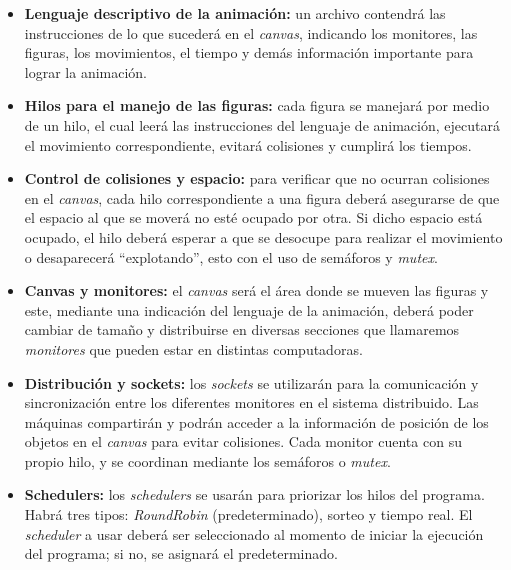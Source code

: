 \documentclass[12pt]{article}
\begin{document}
\begin{itemize}
    \item \textbf{Lenguaje descriptivo de la animación:} un archivo contendrá las instrucciones de lo que sucederá en el \textit{canvas}, indicando los monitores, las figuras, los movimientos, el tiempo y demás información importante para lograr la animación.
    
    \item \textbf{Hilos para el manejo de las figuras:} cada figura se manejará por medio de un hilo, el cual leerá las instrucciones del lenguaje de animación, ejecutará el movimiento correspondiente, evitará colisiones y cumplirá los tiempos.
    
    \item \textbf{Control de colisiones y espacio:} para verificar que no ocurran colisiones en el \textit{canvas}, cada hilo correspondiente a una figura deberá asegurarse de que el espacio al que se moverá no esté ocupado por otra. Si dicho espacio está ocupado, el hilo deberá esperar a que se desocupe para realizar el movimiento o desaparecerá ``explotando'', esto con el uso de semáforos y \textit{mutex}.
    
    \item \textbf{Canvas y monitores:} el \textit{canvas} será el área donde se mueven las figuras y este, mediante una indicación del lenguaje de la animación, deberá poder cambiar de tamaño y distribuirse en diversas secciones que llamaremos \textit{monitores} que pueden estar en distintas computadoras.
    
    \item \textbf{Distribución y sockets:} los \textit{sockets} se utilizarán para la comunicación y sincronización entre los diferentes monitores en el sistema distribuido. Las máquinas compartirán y podrán acceder a la información de posición de los objetos en el \textit{canvas} para evitar colisiones. Cada monitor cuenta con su propio hilo, y se coordinan mediante los semáforos o \textit{mutex}.
    
    \item \textbf{Schedulers:} los \textit{schedulers} se usarán para priorizar los hilos del programa. Habrá tres tipos: \textit{RoundRobin} (predeterminado), sorteo y tiempo real. El \textit{scheduler} a usar deberá ser seleccionado al momento de iniciar la ejecución del programa; si no, se asignará el predeterminado.
\end{itemize}
\end{document}
